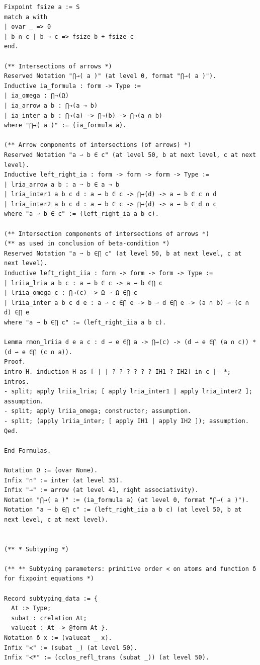 \begin{lstlisting}
Fixpoint fsize a := S
match a with
| ovar _ => 0
| b ∩ c | b → c => fsize b + fsize c
end.

(** Intersections of arrows *)
Reserved Notation "⋂→( a )" (at level 0, format "⋂→( a )").
Inductive ia_formula : form -> Type :=
| ia_omega : ⋂→(Ω)
| ia_arrow a b : ⋂→(a → b)
| ia_inter a b : ⋂→(a) -> ⋂→(b) -> ⋂→(a ∩ b)
where "⋂→( a )" := (ia_formula a).

(** Arrow components of intersections (of arrows) *)
Reserved Notation "a ⇀ b ∈ c" (at level 50, b at next level, c at next level).
Inductive left_right_ia : form -> form -> form -> Type :=
| lria_arrow a b : a ⇀ b ∈ a → b
| lria_inter1 a b c d : a ⇀ b ∈ c -> ⋂→(d) -> a ⇀ b ∈ c ∩ d
| lria_inter2 a b c d : a ⇀ b ∈ c -> ⋂→(d) -> a ⇀ b ∈ d ∩ c
where "a ⇀ b ∈ c" := (left_right_ia a b c).

(** Intersection components of intersections of arrows *)
(** as used in conclusion of beta-condition *)
Reserved Notation "a ⇀ b ∈⋂ c" (at level 50, b at next level, c at next level).
Inductive left_right_iia : form -> form -> form -> Type :=
| lriia_lria a b c : a ⇀ b ∈ c -> a ⇀ b ∈⋂ c
| lriia_omega c : ⋂→(c) -> Ω ⇀ Ω ∈⋂ c
| lriia_inter a b c d e : a ⇀ c ∈⋂ e -> b ⇀ d ∈⋂ e -> (a ∩ b) ⇀ (c ∩ d) ∈⋂ e
where "a ⇀ b ∈⋂ c" := (left_right_iia a b c).

Lemma rmon_lriia d e a c : d ⇀ e ∈⋂ a -> ⋂→(c) -> (d ⇀ e ∈⋂ (a ∩ c)) * (d ⇀ e ∈⋂ (c ∩ a)).
Proof.
intro H. induction H as [ | | ? ? ? ? ? ? IH1 ? IH2] in c |- *; intros.
- split; apply lriia_lria; [ apply lria_inter1 | apply lria_inter2 ]; assumption.
- split; apply lriia_omega; constructor; assumption.
- split; (apply lriia_inter; [ apply IH1 | apply IH2 ]); assumption.
Qed.

End Formulas.

Notation Ω := (ovar None).
Infix "∩" := inter (at level 35).
Infix "→" := arrow (at level 41, right associativity).
Notation "⋂→( a )" := (ia_formula a) (at level 0, format "⋂→( a )").
Notation "a ⇀ b ∈⋂ c" := (left_right_iia a b c) (at level 50, b at next level, c at next level).


(** * Subtyping *)

(** ** Subtyping parameters: primitive order ≺ on atoms and function δ for fixpoint equations *)

Record subtyping_data := {
  At :> Type;
  subat : crelation At;
  valueat : At -> @form At }.
Notation δ x := (valueat _ x).
Infix "≺" := (subat _) (at level 50).
Infix "≺*" := (cclos_refl_trans (subat _)) (at level 50).


\end{lstlisting}
